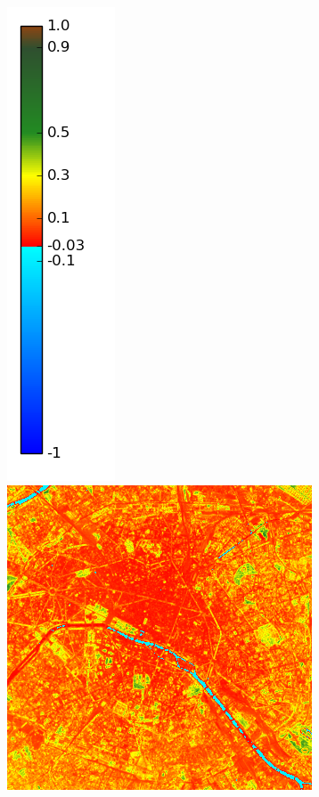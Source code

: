 \documentclass{book}
\begin{document}
\begin{figure}[H]
{\includegraphics[scale=0.2]{images/colormap.png}
\includegraphics[scale=0.25]{images/Paris/07_ndvi.png}
}
\end{figure}
\end{document}
